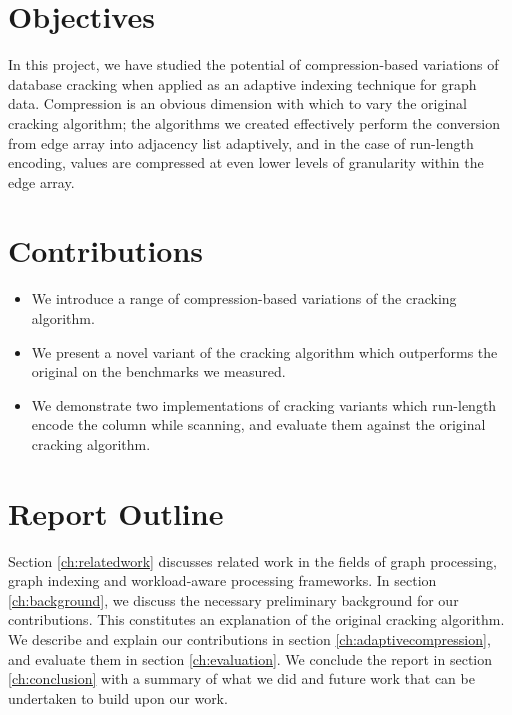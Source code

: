 \section{Objectives}

In this project, we have studied the potential of compression-based variations of database cracking when applied as an adaptive indexing technique for graph data. Compression is an obvious dimension with which to vary the original cracking algorithm; the algorithms we created effectively perform the conversion from edge array into adjacency list adaptively, and in the case of run-length encoding, values are compressed at even lower levels of granularity within the edge array.

\section{Contributions}

\begin{itemize}
\item We introduce a range of compression-based variations of the cracking \cite{DBLP:conf/cidr/IdreosKM07} algorithm.
\item We present a novel variant of the cracking algorithm which outperforms the original on the benchmarks we measured.
\item We demonstrate two implementations of cracking variants which run-length encode the column while scanning, and evaluate them against the original cracking algorithm.
\end{itemize}

\section{Report Outline}

Section \ref{ch:relatedwork} discusses related work in the fields of graph processing, graph indexing and workload-aware processing frameworks. In section \ref{ch:background}, we discuss the necessary preliminary background for our contributions. This constitutes an explanation of the original cracking algorithm. We describe and explain our contributions in section \ref{ch:adaptivecompression}, and evaluate them in section \ref{ch:evaluation}. We conclude the report in section \ref{ch:conclusion} with a summary of what we did and future work that can be undertaken to build upon our work.